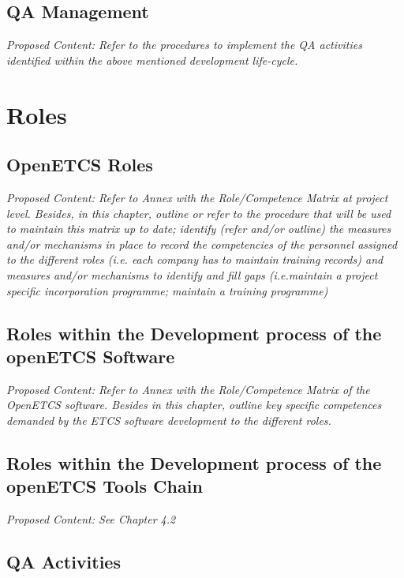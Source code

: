 \documentclass{template/openetcs_article}
\begin{document}
\subsection{QA Management }
\textit{Proposed Content: Refer to the procedures to implement the QA activities identified within the above mentioned development life-cycle. }


\section{Roles}
\subsection{OpenETCS Roles}


\textit{Proposed Content: Refer to Annex with the Role/Competence Matrix at project level.
Besides, in this chapter,  outline or refer to the procedure that will be used to maintain this matrix up to date; identify (refer and/or outline) the measures and/or mechanisms in place to record the competencies of the personnel assigned to the different roles (i.e. each company has to maintain training records) and measures and/or mechanisms to identify and fill gaps (i.e.maintain a project specific incorporation programme; maintain a training programme)}

\subsection{Roles within the Development process of the openETCS Software}
\textit{Proposed Content: Refer to Annex with the Role/Competence Matrix of the OpenETCS software. 
Besides in this chapter, outline key specific competences demanded by the ETCS software development to the different roles.}

\subsection{Roles within the Development process of the openETCS Tools Chain}
\textit{Proposed Content: See Chapter 4.2}

\subsection{QA Activities}
\end{document}
